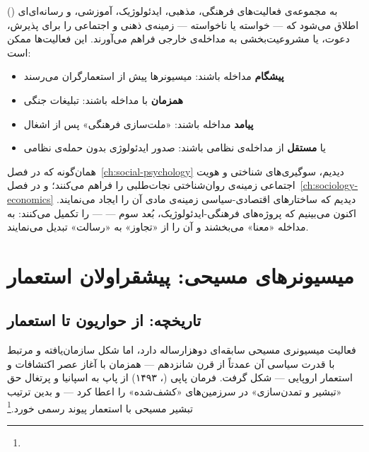 \begin{tcolorbox}[defbox, title={مفهوم کلیدی: تسهیل‌گری فرهنگی مداخله}]
 () به مجموعه‌ی فعالیت‌های فرهنگی، مذهبی، ایدئولوژیک، آموزشی، و رسانه‌ای‌ای اطلاق می‌شود که — خواسته یا ناخواسته — زمینه‌ی ذهنی و اجتماعی را برای پذیرش، دعوت، یا مشروعیت‌بخشی به مداخله‌ی خارجی فراهم می‌آورند. این فعالیت‌ها ممکن است:
\begin{itemize}
\item \textbf{پیشگام} مداخله باشند: میسیونرها پیش از استعمارگران می‌رسند
\item \textbf{همزمان} با مداخله باشند: تبلیغات جنگی
\item \textbf{پیامد} مداخله باشند: «ملت‌سازی فرهنگی» پس از اشغال
\item یا \textbf{مستقل} از مداخله‌ی نظامی باشند: صدور ایدئولوژی بدون حمله‌ی نظامی
\end{itemize}
\end{tcolorbox}

همان‌گونه که در فصل~\ref{ch:social-psychology} دیدیم، سوگیری‌های شناختی و هویت اجتماعی زمینه‌ی روان‌شناختی نجات‌طلبی را فراهم می‌کنند؛ و در فصل~\ref{ch:sociology-economics} دیدیم که ساختارهای اقتصادی-سیاسی زمینه‌ی مادی آن را ایجاد می‌نمایند. اکنون می‌بینیم که پروژه‌های فرهنگی-ایدئولوژیک، بُعد سوم —  — را تکمیل می‌کنند: به مداخله «معنا» می‌بخشند و آن را از «تجاوز» به «رسالت» تبدیل می‌نمایند.


\section{میسیونرهای مسیحی: پیشقراولان استعمار}
\label{sec:ch13-christian-missionaries}

\subsection{تاریخچه: از حواریون تا استعمار}
\label{subsec:ch13-missionaries-history}

فعالیت میسیونری مسیحی سابقه‌ای دوهزارساله دارد، اما شکل سازمان‌یافته و مرتبط با قدرت سیاسی آن عمدتاً از قرن شانزدهم — همزمان با آغاز عصر اکتشافات و استعمار اروپایی — شکل گرفت. فرمان پاپی  (، ۱۴۹۳) از پاپ  به اسپانیا و پرتغال حق «تبشیر و تمدن‌سازی» در سرزمین‌های «کشف‌شده» را اعطا کرد — و بدین ترتیب تبشیر مسیحی با استعمار پیوند رسمی خورد.\footnote{}


